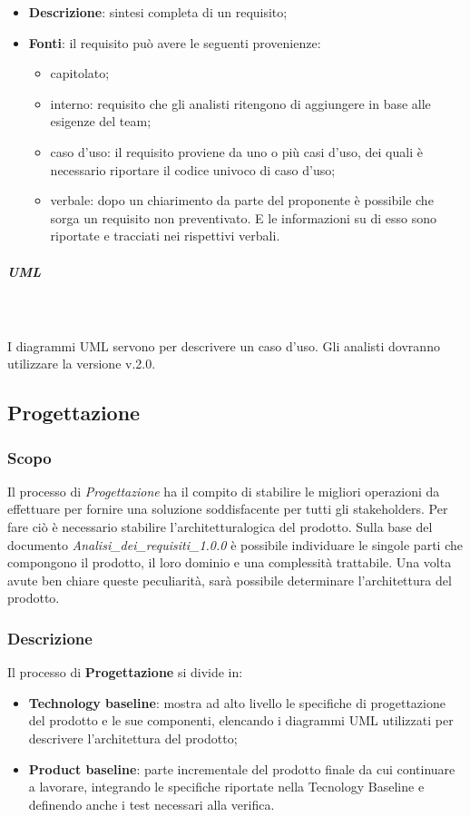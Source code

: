 \begin{itemize}
					\item \textbf{Descrizione}: sintesi completa di un requisito;
					\item \textbf{Fonti}: il requisito può avere le seguenti provenienze:
					\begin{itemize}
						\item capitolato;
						\item interno: requisito che gli analisti ritengono di aggiungere in base alle esigenze del team;
						\item caso d'uso: il requisito proviene da uno o più casi d'uso, dei quali è necessario riportare il codice univoco di caso d'uso;
						\item verbale: dopo un chiarimento da parte del proponente è possibile che sorga un requisito non preventivato. E le informazioni su di esso sono riportate e tracciati nei rispettivi verbali.
					\end{itemize}
				\end{itemize} 
				\subparagraph*{UML} \mbox{} \\ \mbox{} \\
				I diagrammi UML servono per descrivere un caso d'uso. Gli analisti dovranno utilizzare la versione v.2.0.
	\subsection{Progettazione}
		\subsubsection{Scopo}
		Il processo di \textit{Progettazione} ha il compito di stabilire le migliori operazioni da effettuare per fornire una soluzione soddisfacente per tutti gli stakeholders\glo. Per fare ciò è necessario stabilire l'architettura\glo logica del prodotto. Sulla base del documento \textit{Analisi\_dei\_requisiti\_1.0.0} è possibile individuare le singole parti che compongono il prodotto, il loro dominio e una complessità trattabile. Una volta avute ben chiare queste peculiarità, sarà possibile determinare l'architettura del prodotto.
		\subsubsection{Descrizione}
		Il processo di \textbf{Progettazione} si divide in:
			\begin{itemize}
				\item \textbf{Technology baseline}: mostra ad alto livello le specifiche di progettazione del prodotto e le sue componenti, elencando i diagrammi UML utilizzati per descrivere l'architettura del prodotto;
				\item \textbf{Product baseline}: parte incrementale del prodotto finale da cui continuare a lavorare, integrando le specifiche riportate nella Tecnology Baseline e  definendo anche i test necessari alla verifica.
			\end{itemize} 
